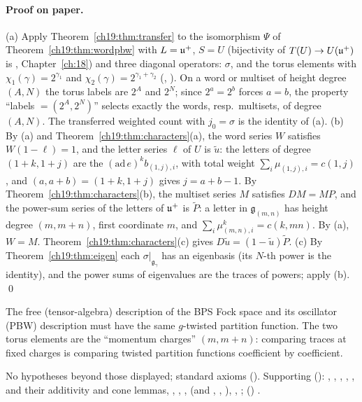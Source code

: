 \paragraph{Proof on paper.}  (a) Apply Theorem~\ref{ch19:thm:transfer} to the isomorphism $\Psi$ of Theorem~\ref{ch19:thm:wordpbw} with
$L=\mathfrak{u}^+$, $S=U$ (bijectivity of $T(U)\to U(\mathfrak{u}^+)$ is ,
Chapter~\ref{ch:18}) and three diagonal operators: $\sigma$, and the torus elements with $\chi_1(\gamma)=2^{\gamma_1}$ and
$\chi_2(\gamma)=2^{\gamma_1+\gamma_2}$ (, ).  On a word or multiset of height degree $(A,N)$
the torus labels are $2^A$ and $2^N$; since $2^a=2^b$ forces $a=b$, the property ``labels $=(2^A,2^N)$'' selects exactly the words,
resp.\ multisets, of degree $(A,N)$.  The transferred weighted count with $j_0=\sigma$ is the identity of (a).  (b) By (a) and
Theorem~\ref{ch19:thm:characters}(a), the word series $W$ satisfies $W(1-\ell)=1$, and the letter series $\ell$ of $U$ is
$\tilde u$: the letters of degree $(1+k,1+j)$ are the $(\mathrm{ad}\,e)^kb_{(1,j),i}$, with total weight $\sum_i\mu_{(1,j),i}=c(1,j)$, and
$(a,a+b)=(1+k,1+j)$ gives $j=a+b-1$.  By Theorem~\ref{ch19:thm:characters}(b), the multiset series $M$ satisfies $DM=MP$, and the
power-sum series of the letters of $\mathfrak{u}^+$ is $\tilde P$: a letter in $\mathfrak g_{(m,n)}$ has height degree $(m,m+n)$, first
coordinate $m$, and $\sum_i\mu^k_{(m,n),i}=c(k,mn)$.  By (a), $W=M$.  Theorem~\ref{ch19:thm:characters}(c) gives
$D\tilde u=(1-\tilde u)\tilde P$.  (c) By Theorem~\ref{ch19:thm:eigen} each $\sigma|_{\mathfrak g_\gamma}$ has an eigenbasis (its $N$-th power is
the identity), and the power sums of eigenvalues are the traces of powers; apply (b). \qed
\begin{physics}
The free (tensor-algebra) description of the BPS Fock space and its oscillator (PBW) description must have the same
$g$-twisted partition function.  The two torus elements are the ``momentum charges'' $(m,m+n)$: comparing traces at fixed
charges is comparing twisted partition functions coefficient by coefficient.
\end{physics}
\begin{status}No hypotheses beyond those displayed; standard axioms ().  Supporting
(): , ,
, , ,  and their additivity and
cone lemmas, , , , 
(and , , ), , ;
() .\end{status}

